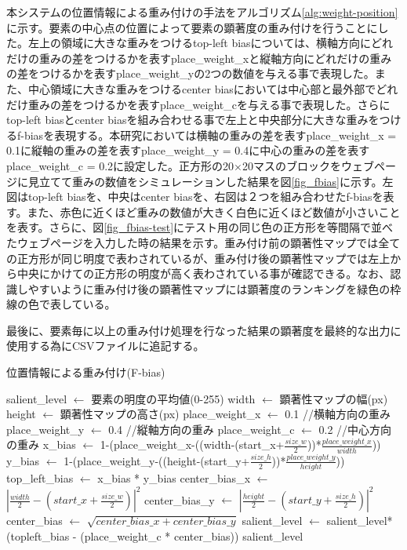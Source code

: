 \par 本システムの位置情報による重み付けの手法をアルゴリズム\ref{alg:weight-position}に示す。要素の中心点の位置によって要素の顕著度の重み付けを行うことにした。左上の領域に大きな重みをつけるtop-left biasについては、横軸方向にどれだけの重みの差をつけるかを表すplace\_weight\_xと縦軸方向にどれだけの重みの差をつけるかを表すplace\_weight\_yの2つの数値を与える事で表現した。また、中心領域に大きな重みをつけるcenter biasにおいては中心部と最外部でどれだけ重みの差をつけるかを表すplace\_weight\_cを与える事で表現した。さらにtop-left biasとcenter biasを組み合わせる事で左上と中央部分に大きな重みをつけるf-biasを表現する。本研究においては横軸の重みの差を表すplace\_weight\_x = 0.1に縦軸の重みの差を表すplace\_weight\_y = 0.4に中心の重みの差を表すplace\_weight\_c = 0.2に設定した。正方形の20$\times$20マスのブロックをウェブページに見立てて重みの数値をシミュレーションした結果を図\ref{fig_fbias}に示す。左図はtop-left biasを、中央はcenter biasを、右図は２つを組み合わせたf-biasを表す。また、赤色に近くほど重みの数値が大きく白色に近くほど数値が小さいことを表す。さらに、図\ref{fig_fbias-test}にテスト用の同じ色の正方形を等間隔で並べたウェブページを入力した時の結果を示す。重み付け前の顕著性マップでは全ての正方形が同じ明度で表わされているが、重み付け後の顕著性マップでは左上から中央にかけての正方形の明度が高く表わされている事が確認できる。なお、認識しやすいように重み付け後の顕著性マップには顕著度のランキングを緑色の枠線の色で表している。

\par 最後に、要素毎に以上の重み付け処理を行なった結果の顕著度を最終的な出力に使用する為にCSVファイルに追記する。

\begin{algorithm}[H]
    \caption{位置情報による重み付け(F-bias)}
    \label{alg:weight-position}
    \begin{algorithmic}
    \State salient\_level $ \leftarrow $ 要素の明度の平均値(0-255)
    \State width $ \leftarrow $ 顕著性マップの幅(px)
    \State height $ \leftarrow $ 顕著性マップの高さ(px) 
    \State place\_weight\_x $ \leftarrow $ 0.1 //横軸方向の重み
    \State place\_weight\_y $ \leftarrow $ 0.4 //縦軸方向の重み
    \State place\_weight\_c $ \leftarrow $ 0.2 //中心方向の重み
        \State x\_bias $ \leftarrow $ 1-(place\_weight\_x-((width-(start\_x+$\frac{size\_w}{2}$))*$\frac{place\_weight\_x}{width}$))
        \State y\_bias $ \leftarrow $ 1-(place\_weight\_y-((height-(start\_y+$\frac{size\_h}{2}$))*$\frac{place\_weight\_y}{height}$))
        \State top\_left\_bias $ \leftarrow $ x\_bias * y\_bias
        \State center\_bias\_x $ \leftarrow $ $|\frac{width}{2}-(start\_x+\frac{size\_w}{2})|^2$
        \State center\_bias\_y $ \leftarrow $ $|\frac{height}{2}-(start\_y+\frac{size\_h}{2})|^2$
        \State center\_bias $ \leftarrow $ $\sqrt{center\_bias\_x + center\_bias\_y} $
        \State salient\_level $ \leftarrow $ salient\_level*(topleft\_bias - (place\_weight\_c * center\_bias))
    \EndIf
    \State \Return salient\_level
    \EndFunction
    \end{algorithmic}
\end{algorithm}

